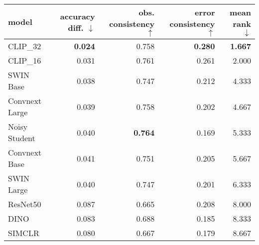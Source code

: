 \begin{tabular}{lrrrr}
\toprule
         model & accuracy diff. $\downarrow$ & obs. consistency $\uparrow$ & error consistency $\uparrow$ & mean rank $\downarrow$ \\
\midrule
      CLIP\_32 &              \textbf{0.024} &                       0.758 &               \textbf{0.280} &         \textbf{1.667} \\
      CLIP\_16 &                       0.031 &                       0.761 &                        0.261 &                  2.000 \\
     SWIN Base &                       0.038 &                       0.747 &                        0.212 &                  4.333 \\
Convnext Large &                       0.039 &                       0.758 &                        0.202 &                  4.667 \\
 Noisy Student &                       0.040 &              \textbf{0.764} &                        0.169 &                  5.333 \\
 Convnext Base &                       0.041 &                       0.751 &                        0.205 &                  5.667 \\
    SWIN Large &                       0.040 &                       0.747 &                        0.201 &                  6.333 \\
      ResNet50 &                       0.087 &                       0.665 &                        0.208 &                  8.000 \\
          DINO &                       0.083 &                       0.688 &                        0.185 &                  8.333 \\
        SIMCLR &                       0.080 &                       0.667 &                        0.179 &                  8.667 \\
\bottomrule
\end{tabular}

